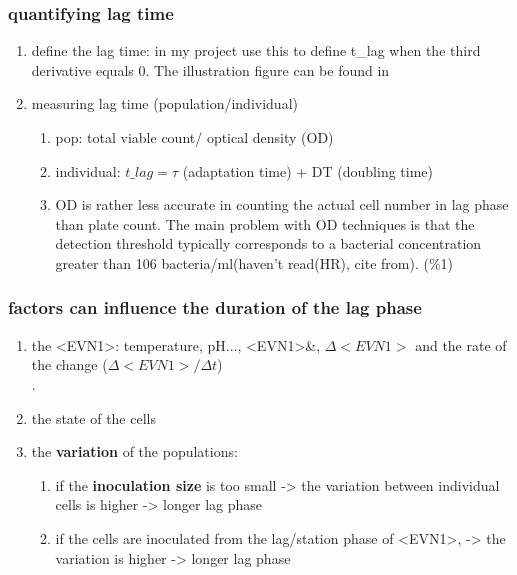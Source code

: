 \subsubsection{quantifying lag time}
\begin{enumerate}
    \item define the lag time:
    in my project use this\citep{buchanan1990mathematical} to define t\_lag when the third derivative equals 0. The illustration figure can be found in \citep{zwietering1992comparison}\\
    \item measuring lag time (population/individual)
    \begin{enumerate}
        \item pop: total viable count/ optical density (OD)
        \item individual: \(t\_lag = \tau\) (adaptation time) + DT (doubling time)
        \item OD is rather less accurate in counting the actual cell number in lag phase than plate count. The main problem with OD techniques is that the detection threshold typically corresponds to a bacterial concentration greater than 106 bacteria/ml\citep{begot1996recommendations}(haven't read(HR), cite from\citep{swinnen2005quantifying}). (\%1)
    \end{enumerate}
\end{enumerate}

\subsubsection{factors can influence the duration of the lag phase}
\begin{enumerate}
    \item the <EVN1>:
    temperature, pH..., <EVN1>\&<EVN2>, \(\Delta<EVN1>\) and the rate of the change (\(\Delta<EVN1> / \Delta t\))\\.
    \item the state of the cells
    \item the \textbf{variation} of the populations:
    \begin{enumerate}
        \item if the \textbf{inoculation size} is too small -> the variation between individual cells is higher -> longer lag phase
        \item if the cells are inoculated from the lag/station phase of <EVN1>, -> the variation is higher -> longer lag phase
    \end{enumerate}
\end{enumerate}
    
